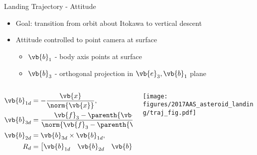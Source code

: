 

\begin{frame}{Landing Trajectory - Attitude}
    \begin{itemize}
        \item Goal: transition from  orbit about Itokawa to vertical descent
        \item Attitude controlled to point camera at surface
            \begin{itemize}
                \item \( \vb{b}_1 \) - body axis points at surface
                \item \( \vb{b}_3 \) - orthogonal projection in \( \vb{e}_3, \vb{b}_1\) plane
            \end{itemize}
    \end{itemize}
    \begin{columns}
        \begin{column}{0.5\textwidth}
        \begin{align*}
            \vb{b}_{1d} &= - \frac{\vb{x}}{\norm{\vb{x}}} , \\
            \vb{b}_{3d} &= \frac{\vb{f}_3 - \parenth{\vb{f}_3 \cdot \vb{b}_{1d}} \vb{b}_{1d}}{\norm{\vb{f}_3 - \parenth{\vb{f}_3 \cdot \vb{b}_{1d}} \vb{b}_{1d}}}, \\
            \vb{b}_{2d} &= \vb{b}_{3d} \times \vb{b}_{1d} , \\
        R_d &= \begin{bmatrix} \vb{b}_{1d} & \vb{b}_{2d} & \vb{b}_{3d} \end{bmatrix} .
        \end{align*}
    \end{column}
    \begin{column}{0.5\textwidth}
        \texttt{[image: figures/2017AAS\_asteroid\_landing/traj\_fig.pdf]}
\end{column}
\end{columns}
\end{frame}

